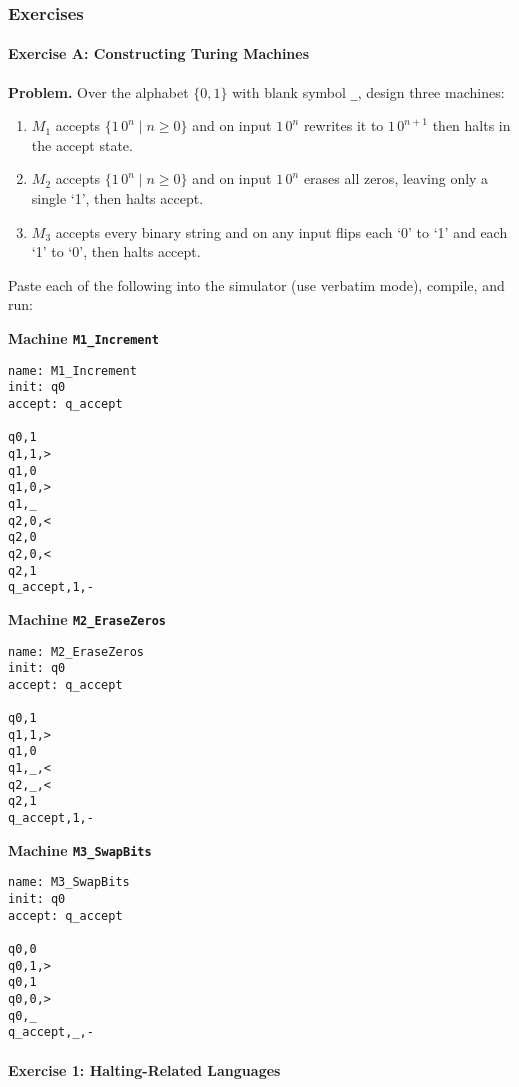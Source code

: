 \documentclass{article}
\theoremstyle{theorem}
\theoremstyle{definition}
\theoremstyle{remark}
\begin{document}
\subsubsection{Exercises}

\paragraph*{Exercise A: Constructing Turing Machines}

\textbf{Problem.}  Over the alphabet \(\{0,1\}\) with blank symbol \texttt{\_}, design three machines:

\begin{enumerate}
  \item \(M_{1}\) accepts \(\{1\,0^n\mid n\ge0\}\) and on input \(1\,0^n\) rewrites it to \(1\,0^{n+1}\) then halts in the accept state.
  \item \(M_{2}\) accepts \(\{1\,0^n\mid n\ge0\}\) and on input \(1\,0^n\) erases all zeros, leaving only a single `1', then halts accept.
  \item \(M_{3}\) accepts every binary string and on any input flips each `0' to `1' and each `1' to `0', then halts accept.
\end{enumerate}

Paste each of the following into the simulator (use verbatim mode), compile, and run:

\bigskip
\noindent\textbf{Machine \texttt{M1\_Increment}}  
\begin{verbatim}
name: M1_Increment
init: q0
accept: q_accept

q0,1
q1,1,>
q1,0
q1,0,>
q1,_
q2,0,<
q2,0
q2,0,<
q2,1
q_accept,1,-
\end{verbatim}

\newpage

\bigskip
\noindent\textbf{Machine \texttt{M2\_EraseZeros}}  
\begin{verbatim}
name: M2_EraseZeros
init: q0
accept: q_accept

q0,1
q1,1,>
q1,0
q1,_,<
q2,_,<
q2,1
q_accept,1,-
\end{verbatim}

\bigskip
\noindent\textbf{Machine \texttt{M3\_SwapBits}}  
\begin{verbatim}
name: M3_SwapBits
init: q0
accept: q_accept

q0,0
q0,1,>
q0,1
q0,0,>
q0,_
q_accept,_,-
\end{verbatim}

\bigskip
\paragraph*{Exercise 1: Halting-Related Languages}
\end{document}
